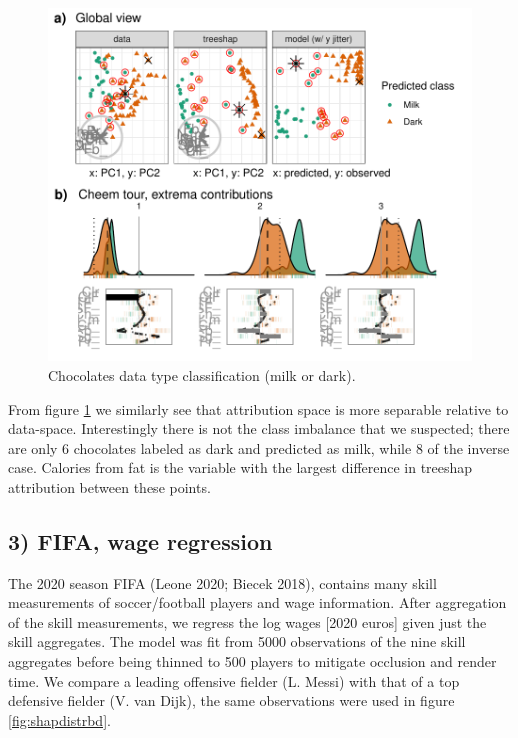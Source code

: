 \documentclass[
  article]{article}
\begin{document}
\begin{figure}

{\centering \includegraphics[width=1\linewidth]{./figures/case_chocolates} 

}

\caption{Chocolates data type classification (milk or dark).}\label{fig:casechocolates}
\end{figure}

From figure \ref{fig:casechocolates} we similarly see that attribution space is more separable relative to data-space. Interestingly there is not the class imbalance that we suspected; there are only 6 chocolates labeled as dark and predicted as milk, while 8 of the inverse case. Calories from fat is the variable with the largest difference in treeshap attribution between these points.

\hypertarget{fifa-wage-regression}{%
\subsection{3) FIFA, wage regression}\label{fifa-wage-regression}}

The 2020 season FIFA (Leone 2020; Biecek 2018), contains many skill measurements of soccer/football players and wage information. After aggregation of the skill measurements, we regress the log wages {[}2020 euros{]} given just the skill aggregates. The model was fit from 5000 observations of the nine skill aggregates before being thinned to 500 players to mitigate occlusion and render time. We compare a leading offensive fielder (L. Messi) with that of a top defensive fielder (V. van Dijk), the same observations were used in figure \ref{fig:shapdistrbd}.
\end{document}
